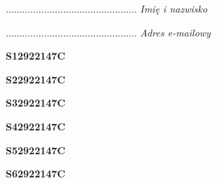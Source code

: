 \begin{turn}{90}\begin{minipage}{\linewidth} \vspace{20mm} ................................................  \textit{Imię i nazwisko}\end{minipage}\end{turn}

\begin{turn}{90}\begin{minipage}{\linewidth} \vspace{20mm} ................................................  \textit{Adres e-mailowy}\end{minipage}\end{turn}

\begin{turn}{90}\huge \begin{minipage}{\linewidth} \vspace{10mm}\textbf{S12922147C}\end{minipage}\end{turn}

\begin{turn}{90}\huge \begin{minipage}{\linewidth} \vspace{10mm}\textbf{S22922147C}\end{minipage}\end{turn}

\begin{turn}{90}\huge \begin{minipage}{\linewidth} \vspace{10mm}\textbf{S32922147C}\end{minipage}\end{turn}

\begin{turn}{90}\huge \begin{minipage}{\linewidth} \vspace{10mm}\textbf{S42922147C}\end{minipage}\end{turn}

\begin{turn}{90}\huge \begin{minipage}{\linewidth} \vspace{10mm}\textbf{S52922147C}\end{minipage}\end{turn}

\begin{turn}{90}\huge \begin{minipage}{\linewidth} \vspace{10mm}\textbf{S62922147C}\end{minipage}\end{turn}

